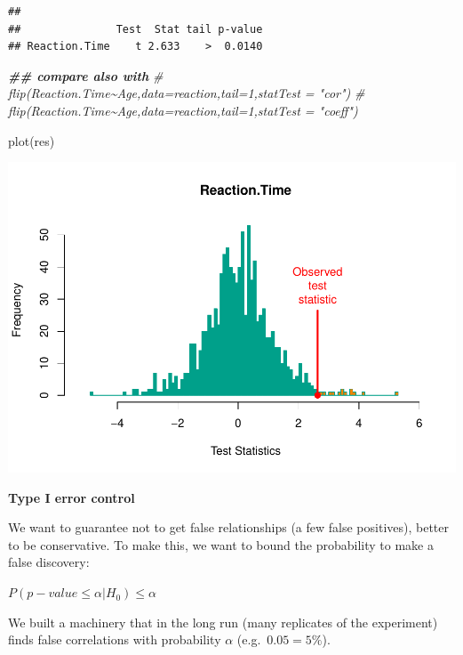 \documentclass[
]{article}
\newenvironment{Shaded}{\begin{snugshade}}{\end{snugshade}}
\newcommand{\CommentTok}[1]{\textcolor[rgb]{0.56,0.35,0.01}{\textit{#1}}}
\newcommand{\DocumentationTok}[1]{\textcolor[rgb]{0.56,0.35,0.01}{\textbf{\textit{#1}}}}
\newcommand{\FunctionTok}[1]{\textcolor[rgb]{0.00,0.00,0.00}{#1}}
\newcommand{\NormalTok}[1]{#1}
\begin{document}
\begin{verbatim}
## 
##               Test  Stat tail p-value
## Reaction.Time    t 2.633    >  0.0140
\end{verbatim}

\begin{Shaded}
\begin{Highlighting}[]
\DocumentationTok{\#\# compare also with}
\CommentTok{\# flip(Reaction.Time\textasciitilde{}Age,data=reaction,tail=1,statTest = "cor")}
\CommentTok{\# flip(Reaction.Time\textasciitilde{}Age,data=reaction,tail=1,statTest = "coeff")}
\end{Highlighting}
\end{Shaded}

\begin{Shaded}
\begin{Highlighting}[]
\FunctionTok{plot}\NormalTok{(res)}
\end{Highlighting}
\end{Shaded}

\begin{center}\includegraphics{perm_files/figure-latex/unnamed-chunk-14-1} \end{center}

\textbf{Type I error control}

We want to guarantee not to get false relationships (a few false
positives), better to be conservative. To make this, we want to bound
the probability to make a false discovery:

\(P (p-value \leq \alpha | H_0) \leq \alpha\)

We built a machinery that in the long run (many replicates of the
experiment) finds false correlations with probability \(\alpha\)
(e.g.~\(0.05=5\%\)).
\end{document}
